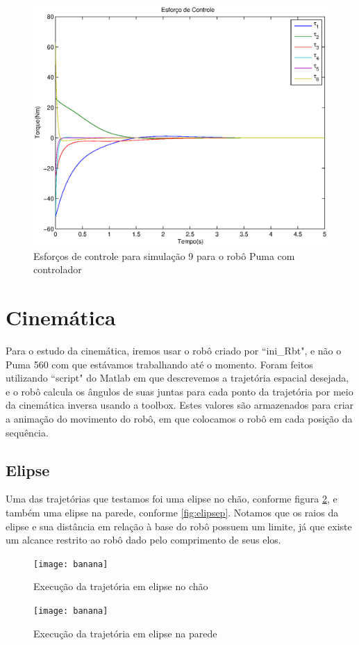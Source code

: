 \documentclass{article}
\begin{document}
\begin{figure}[H]
	\centering
	\includegraphics[width=0.8\linewidth]{../sim3clu}
	\caption{Esforços de controle para simulação 9 para o robô Puma com controlador}
	\label{fig:pumasim9clu}
\end{figure}


\section{Cinemática}
Para o estudo da cinemática, iremos usar o robô criado por ``ini\_Rbt"\cite{bb:inirbt}, e não o Puma 560 com que estávamos trabalhando até o momento. Foram feitos utilizando ``script" do Matlab em que descrevemos a trajetória espacial desejada, e o robô calcula os ângulos de suas juntas para cada ponto da trajetória por meio da cinemática inversa usando a toolbox\cite{bb:toolbox}. Estes valores são armazenados para criar a animação do movimento do robô, em que colocamos o robô em cada posição da sequência.

\subsection{Elipse}
Uma das trajetórias que testamos foi uma elipse no chão, conforme figura \ref{fig:elipsec}, e também uma elipse na parede, conforme \ref{fig:elipsep}. Notamos que os raios da elipse e sua distância em relação à base do robô possuem um limite, já que existe um alcance restrito ao robô dado pelo comprimento de seus elos.

\begin{figure}[H]
	\centering
	\texttt{[image: banana]}
	\caption{Execução da trajetória em elipse no chão}
	\label{fig:elipsec}
\end{figure}
\begin{figure}[H]
	\centering
	\texttt{[image: banana]}
	\caption{Execução da trajetória em elipse na parede}
	\label{fig:elipse}
\end{figure}
\end{document}

